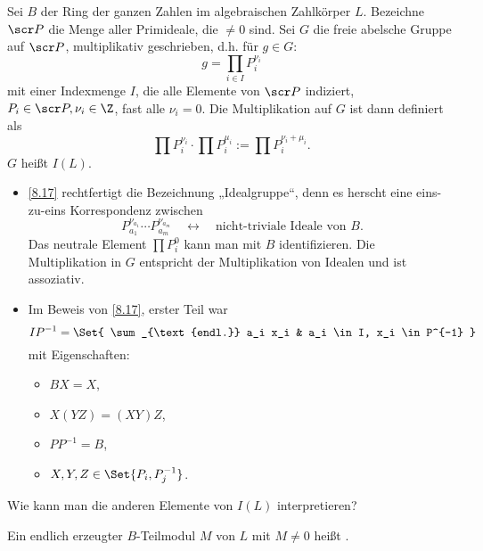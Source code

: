 
\begin{df} \label{8.21}
	Sei $B$ der Ring der ganzen Zahlen im algebraischen Zahlkörper $L$.
	Bezeichne $\scr P$ die Menge aller Primideale, die $\neq 0$ sind.
	Sei $G$ die freie abelsche Gruppe auf $\scr P$, multiplikativ geschrieben, d.h. für $g \in G$:
	\[
		g = \prod_{i\in I} P_i^{\nu_i}
	\]
	mit einer Indexmenge $I$, die alle Elemente von $\scr P$ indiziert, $P_i \in \scr P, \nu_i \in \Z$, fast alle $\nu_i = 0$.
	Die Multiplikation auf $G$ ist dann definiert als
	\[
		\prod P_i^{\nu_i} \cdot \prod P_i^{\mu_i}
		:= \prod P_i^{\nu_i + \mu_i}.
	\]
	$G$ heißt  $I(L)$.
\end{df}

\begin{nt} \label{8.22}
	\begin{itemize}
		\item
			\ref{8.17} rechtfertigt die Bezeichnung „Idealgruppe“, denn es herscht eine eins-zu-eins Korrespondenz zwischen
			\[
				P_{a_1}^{\nu_{a_1}} \dotsb P_{a_m}^{\nu_{a_m}} \quad \leftrightarrow \quad \text{nicht-triviale Ideale von $B$}.
			\]
			Das neutrale Element $\prod P_i^0$ kann man mit $B$ identifizieren.
			Die Multiplikation in $G$ entspricht der Multiplikation von Idealen und ist assoziativ.
		\item
			Im Beweis von \ref{8.17}, erster Teil war
			\[
				I P^{-1} = \Set{ \sum_{\text{endl.}} a_i x_i & a_i \in I, x_i \in P^{-1} }
			\]
			mit Eigenschaften:
			\begin{itemize}
				\item
					$B X = X$,
				\item
					$X(YZ) = (XY)Z$,
				\item
					$PP^{-1} = B$,
				\item
					$X, Y, Z \in \Set{ P_i, P_j^{-1} }$.
			\end{itemize}
	\end{itemize}
\end{nt}

Wie kann man die anderen Elemente von $I(L)$ interpretieren?

\begin{df} \label{8.23}
	Ein endlich erzeugter $B$-Teilmodul $M$ von $L$ mit $M \neq 0$ heißt .
\end{df}

